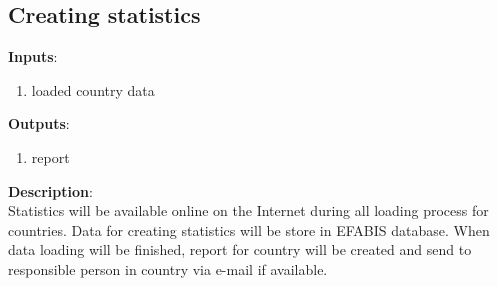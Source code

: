 \subsection{Creating statistics}
\label{sub:createstat}
\textbf{Inputs}:
\begin{enumerate}
\item loaded country data
\end{enumerate}
\textbf{Outputs}:
\begin{enumerate}
\item report
\end{enumerate}
\textbf{Description}:\\
Statistics will be available online on the Internet during all loading process for countries. Data for creating statistics will be store in EFABIS database. When data loading will be finished, report for country will be created and send to responsible person in country via e-mail if available.

\newpage
\makeatother
